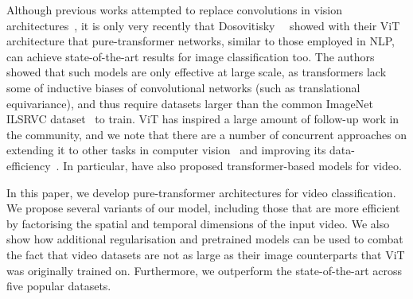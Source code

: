 Although previous works attempted to replace convolutions in vision architectures~\cite{parmar_icml_2018, ramachandran_neurips_2019, shen_gsa_iclr_2021}, it is only very recently that Dosovitisky~\etal~\cite{dosovitskiy_iclr_2021} showed with their ViT architecture that pure-transformer networks, similar to those employed in NLP, can achieve state-of-the-art results for image classification too.
The authors showed that such models are only effective at large scale, as transformers lack some of inductive biases of convolutional networks (such as translational equivariance), and thus require datasets larger than the common ImageNet ILSRVC dataset~\cite{deng_cvpr_2009} to train.
ViT has inspired a large amount of follow-up work in the community, and we note that there are a number of concurrent approaches on extending it to other tasks in computer vision~\cite{wang_maxdeeplab_arxiv_2020,wang_pvt_arxiv_2021, zhao_point_transformer_arxiv_2020,zheng_setr_arxiv_2020} and improving its data-efficiency~\cite{touvron_arxiv_2020,pan_hvt_arxiv_2021}.
In particular, \cite{bertasius_arxiv_2021,neimark_arxiv_2021} have also proposed transformer-based models for video.




In this paper, we develop pure-transformer architectures for video classification.
We propose several variants of our model, including those that are more efficient by factorising the spatial and temporal dimensions of the input video.
We also show how additional regularisation and pretrained models can be used to combat the fact that video datasets are not as large as their image counterparts that ViT was originally trained on.
Furthermore, we outperform the state-of-the-art across five popular datasets.


